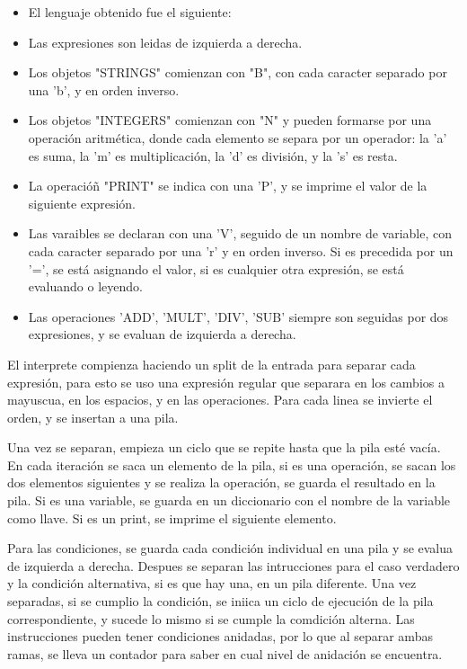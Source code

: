 \documentclass{article}
\begin{document}
\begin{itemize}
	\item El lenguaje obtenido fue el siguiente:
	\item Las expresiones son leidas de izquierda a derecha.
	\item Los objetos "STRINGS" comienzan con "B", con cada caracter separado por una 'b', y en orden inverso.
	\item Los objetos "INTEGERS" comienzan con "N" y pueden formarse por una operación aritmética, donde cada elemento se separa por un operador: la 'a' es suma, la 'm' es multiplicación, la 'd' es división, y la 's' es resta.
	\item La operacióñ "PRINT" se indica con una 'P', y se imprime el valor de la siguiente expresión.
	\item Las varaibles se declaran con una 'V', seguido de un nombre de variable, con cada caracter separado por una 'r' y en orden inverso. Si es precedida por un '=', se está asignando el valor, si es cualquier otra expresión, se está evaluando o leyendo.
	\item Las operaciones 'ADD', 'MULT', 'DIV', 'SUB' siempre son seguidas por dos expresiones, y se evaluan de izquierda a derecha.
\end{itemize}

El interprete compienza haciendo un split de la entrada para separar cada expresión, para esto se uso una expresión regular que separara en los cambios a mayuscua, en los espacios, y en las operaciones. Para cada linea se invierte el orden, y se insertan a 
una pila.

Una vez se separan, empieza un ciclo que se repite hasta que la pila esté vacía. En cada iteración se saca un elemento de la pila, si es una operación, se sacan los dos elementos siguientes y se realiza la operación, se guarda el resultado en la pila. Si es una variable, se guarda en un diccionario con el nombre de la variable como llave. Si es un print, se imprime el siguiente elemento.

Para las condiciones, se guarda cada condición individual en una pila y se evalua de izquierda a derecha. Despues se separan las intrucciones para el caso verdadero y la condición alternativa, si es que hay una, en un pila diferente. Una vez separadas, si se cumplio la condición, se iniica un ciclo de ejecución de la pila correspondiente, y sucede lo mismo si se cumple la comdición alterna. Las instrucciones pueden tener condiciones anidadas, por lo que al separar ambas ramas, se lleva un contador para saber en cual nivel de anidación se encuentra.
\end{document}

